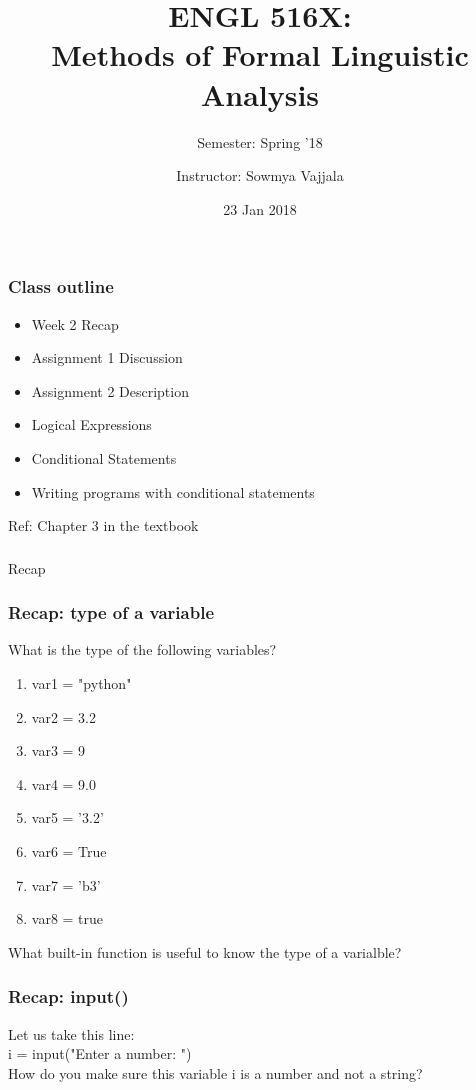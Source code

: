 \documentclass{beamer}
\author[Sowmya Vajjala]{Instructor: Sowmya Vajjala}
\title[ENGL 516X]{ENGL 516X: \\ Methods of Formal Linguistic Analysis}
\subtitle{Semester: Spring '18}
\date{23 Jan 2018}
\institute{Iowa State University, USA}
\begin{document}
\begin{frame}\titlepage
\end{frame}

\begin{frame}
\frametitle{Class outline}
\begin{itemize}
\item Week 2 Recap %
\item Assignment 1 Discussion %
\item Assignment 2 Description %
\item Logical Expressions %
\item Conditional Statements %
\item Writing programs with conditional statements %
\end{itemize}
Ref: Chapter 3 in the textbook
\end{frame} 

\begin{frame}
\frametitle{}
\begin{center}
Recap
\end{center}
\end{frame}

\begin{frame}%
\frametitle{Recap: type of a variable}
What is the type of the following variables?
\begin{enumerate}
\item var1 = "python"
\item var2 = 3.2
\item var3 = 9
\item var4 = 9.0
\item var5 = '3.2'
\item var6 = True
\item var7 = 'b3'
\item var8 = true
\end{enumerate}
\pause What built-in function is useful to know the type of a varialble?
\end{frame}

\begin{frame}%
\frametitle{Recap: input()}
Let us take this line: \\ 
i = input("Enter a number: ")
\\ How do you make sure this variable i is a number and not a string?
\end{frame}
\end{document}
